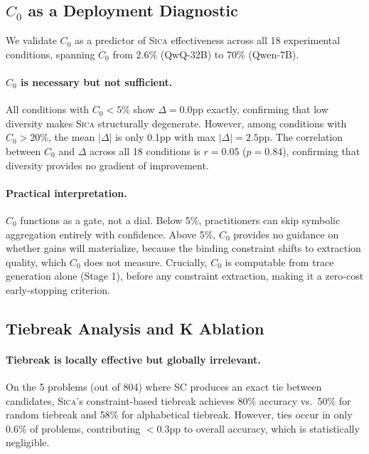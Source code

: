 \documentclass[11pt,a4paper]{article}
\newcommand{\sica}{\textsc{Sica}}
\begin{document}
\subsection{$C_0$ as a Deployment Diagnostic}
\label{sec:c0}

We validate $C_0$ as a predictor of \sica{} effectiveness across all 18 experimental conditions, spanning $C_0$ from 2.6\% (QwQ-32B) to 70\% (Qwen-7B).

\paragraph{$C_0$ is necessary but not sufficient.}
All conditions with $C_0 < 5\%$ show $\Delta = 0.0$pp exactly, confirming that low diversity makes \sica{} structurally degenerate.
However, among conditions with $C_0 > 20\%$, the mean $|\Delta|$ is only 0.1pp with max $|\Delta| = 2.5$pp.
The correlation between $C_0$ and $\Delta$ across all 18 conditions is $r = 0.05$ ($p = 0.84$), confirming that diversity provides no gradient of improvement.

\paragraph{Practical interpretation.}
$C_0$ functions as a gate, not a dial.
Below 5\%, practitioners can skip symbolic aggregation entirely with confidence.
Above 5\%, $C_0$ provides no guidance on whether gains will materialize, because the binding constraint shifts to extraction quality, which $C_0$ does not measure.
Crucially, $C_0$ is computable from trace generation alone (Stage 1), before any constraint extraction, making it a zero-cost early-stopping criterion.

\subsection{Tiebreak Analysis and K Ablation}
\label{sec:tiebreak}

\paragraph{Tiebreak is locally effective but globally irrelevant.}
On the 5 problems (out of 804) where SC produces an exact tie between candidates, \sica{}'s constraint-based tiebreak achieves 80\% accuracy vs.\ 50\% for random tiebreak and 58\% for alphabetical tiebreak.
However, ties occur in only 0.6\% of problems, contributing $<0.3$pp to overall accuracy, which is statistically negligible.
\end{document}
